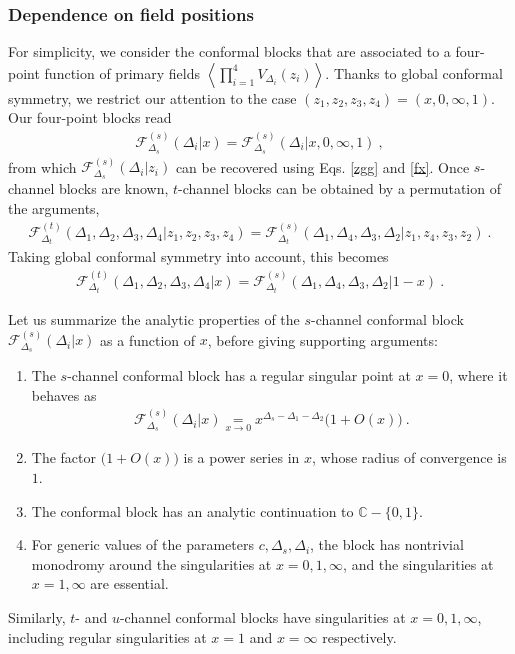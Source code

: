 \documentclass[12pt, a4paper, notitlepage, twoside]{report}
\numberwithin{equation}{section}
\theoremstyle{break}
\begin{document}
\subsubsection{Dependence on field positions}

For simplicity, we consider the conformal blocks that are associated to a four-point function of primary fields $\left<\prod_{i=1}^4V_{\Delta_i}(z_i)\right>$. 
Thanks to global conformal symmetry, we restrict our attention to the case $(z_1,z_2,z_3,z_4)=(x,0,\infty, 1)$. Our four-point blocks read
\begin{align}
 \mathcal{F}^{(s)}_{\Delta_s}(\Delta_i|x)=\mathcal{F}^{(s)}_{\Delta_s}(\Delta_i|x,0,\infty,1)\ ,
\end{align}
from which $\mathcal{F}^{(s)}_{\Delta_s}(\Delta_i|z_i)$ can be recovered  using Eqs. \eqref{zgg} and \eqref{fx}.
Once $s$-channel blocks are known, $t$-channel blocks can be obtained by a permutation of the arguments, 
\begin{align}
 \mathcal{F}^{(t)}_{\Delta_t}(\Delta_1,\Delta_2,\Delta_3,\Delta_4|z_1,z_2,z_3,z_4) = \mathcal{F}^{(s)}_{\Delta_t}(\Delta_1,\Delta_4,\Delta_3,\Delta_2|z_1,z_4,z_3,z_2)\ . 
\label{gtgs}
\end{align}
Taking global conformal symmetry into account, this becomes
\begin{align}
 \mathcal{F}^{(t)}_{\Delta_t}(\Delta_1,\Delta_2,\Delta_3,\Delta_4|x) = \mathcal{F}^{(s)}_{\Delta_t}(\Delta_1,\Delta_4,\Delta_3,\Delta_2|1-x)\ .
\end{align}

Let us summarize the analytic properties of 
the $s$-channel conformal block $\mathcal{F}^{(s)}_{\Delta_s}(\Delta_i|x)$ as a function of $x$, before giving supporting arguments:
\begin{enumerate}
 \item The $s$-channel conformal block has a regular singular point at $x=0$, where it behaves as 
 \begin{align}
 \mathcal{F}^{(s)}_{\Delta_s}(\Delta_i|x) \underset{x\to 0}{=} x^{\Delta_s-\Delta_1-\Delta_2}\Big( 1+ O(x)\Big)\ .
\end{align}
\item The factor $\big( 1+ O(x)\big)$ is a power series in $x$, whose radius of convergence is $1$.
\item The conformal block has an analytic continuation to $\mathbb{C}-\{0,1\}$. 
\item For generic values of the parameters $c,\Delta_s,\Delta_i$, the block has nontrivial monodromy around the singularities at $x=0,1,\infty$, and the singularities at $x=1,\infty$ are essential.
\end{enumerate}
Similarly, $t$- and $u$-channel conformal blocks have singularities at $x=0,1,\infty$, including 
regular singularities at $x=1$ and $x=\infty$ respectively.
\end{document}
